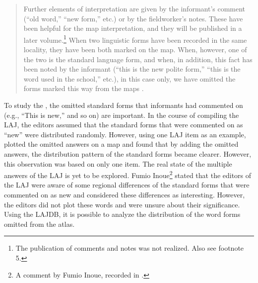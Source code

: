\documentclass[output=paper]{LSP/langsci}
\begin{document}
\begin{quotation}
Further elements of interpretation are given by the informant’s comment (“old word,” “new form,” etc.) or by the fieldworker’s notes. These have been helpful for the map interpretation, and they will be published in a later volume.\footnote{The publication of comments and notes was not realized. Also see footnote 5.} When two linguistic forms have been recorded in the same locality, they have been both marked on the map. When, however, one of the two is the standard language form, and when, in addition, this fact has been noted by the informant (“this is the new polite form,” “this is the word used in the school,” etc.), in this case only, we have omitted the forms marked this way from the maps \citep[44]{kokuritsu_kokugo_kenkyujo_nlri_nihon_1966}.
\end{quotation}

To study the , the omitted standard forms that informants had commented on (e.g., “This is new,” and so on) are important. In the course of compiling the LAJ, the editors assumed that the standard forms that were commented on as “new” were distributed randomly. However, using one LAJ item as an example, \citet[152--153]{sato_chiikishakai_1986} plotted the omitted answers on a map and found that by adding the omitted answers, the distribution pattern of the standard forms became clearer. However, this observation was based on only one item. The real state of the multiple answers of the LAJ is yet to be explored. Fumio Inoue\footnote{A comment by Fumio Inoue, recorded in \citet[5]{inagaki_hogen_1980}.} stated that the editors of the LAJ were aware of some regional differences of the standard forms that were commented on as new and considered these differences as interesting. However, the editors did not plot these words and were unsure about their significance. Using the LAJDB, it is possible to analyze the distribution of the word forms omitted from the atlas.
\end{document}
